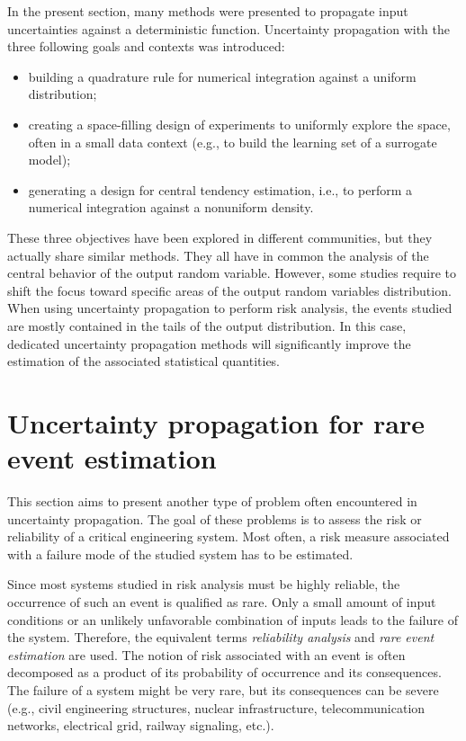 In the present section, many methods were presented to propagate input uncertainties against a deterministic function. 
Uncertainty propagation with the three following goals and contexts was introduced: 
\begin{itemize}
    \item building a quadrature rule for numerical integration against a uniform distribution;
    \item creating a space-filling design of experiments to uniformly explore the space, often in a small data context (e.g., to build the learning set of a surrogate model);
    \item generating a design for central tendency estimation, i.e., to perform a numerical integration against a nonuniform density.
\end{itemize} 
These three objectives have been explored in different communities, but they actually share similar methods. 
They all have in common the analysis of the central behavior of the output random variable. 
However, some studies require to shift the focus toward specific areas of the output random variables distribution. 
When using uncertainty propagation to perform risk analysis, the events studied are mostly contained in the tails of the output distribution. 
In this case, dedicated uncertainty propagation methods will significantly improve the estimation of the associated statistical quantities.


\section{Uncertainty propagation for rare event estimation} \label{sec:reliability}

This section aims to present another type of problem often encountered in uncertainty propagation. 
The goal of these problems is to assess the risk or reliability of a critical engineering system. 
Most often, a risk measure associated with a failure mode of the studied system has to be estimated. 

Since most systems studied in risk analysis must be highly reliable, the occurrence of such an event is qualified as rare. 
Only a small amount of input conditions or an unlikely unfavorable combination of inputs leads to the failure of the system. 
Therefore, the equivalent terms \textit{reliability analysis} and \textit{rare event estimation} are used. 
The notion of risk associated with an event is often decomposed as a product of its probability of occurrence and its consequences. 
The failure of a system might be very rare, but its consequences can be severe (e.g., civil engineering structures, nuclear infrastructure, telecommunication networks, electrical grid, railway signaling, etc.).

